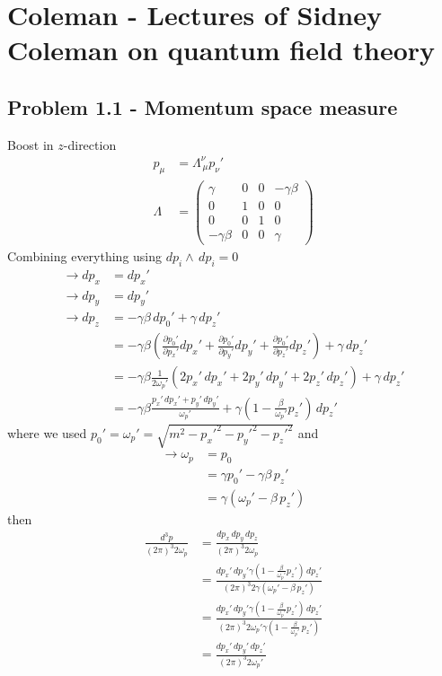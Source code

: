 \documentclass[10pt,a4paper]{book}
\theoremstyle{definition}
\begin{document}
\section{{\sc Coleman} - Lectures of Sidney Coleman on quantum field theory}
\subsection{Problem 1.1 - Momentum space measure}
Boost in $z$-direction
\begin{align}
p_\mu&=\Lambda^\nu_{\,\mu}p_\nu'\\ 
\Lambda&=\left(\begin{array}{cccc}
\gamma & 0 & 0 & -\gamma\beta\\
0 & 1 & 0 & 0\\
0 & 0 & 1 & 0\\
-\gamma\beta & 0 & 0 & \gamma
\end{array}\right)
\end{align}
Combining everything using $dp_i\wedge\,dp_i=0$
\begin{align}
\rightarrow dp_x&=dp_x'\\
\rightarrow dp_y&=dp_y'\\
\rightarrow dp_z
&=-\gamma\beta\,dp_0'+\gamma\,dp_z'\\
&=-\gamma\beta\left(\frac{\partial p_0'}{\partial p_x'}dp_x'+\frac{\partial p_0'}{\partial p_y'}dp_y'+\frac{\partial p_0'}{\partial p_z'}dp_z'\right)+\gamma\,dp_z'\\
&=-\gamma\beta\frac{1}{2\omega_p'}(2p_x'\,dp_x'+2p_y'\,dp_y'+2p_z'\,dp_z')+\gamma\,dp_z'\\
&=-\gamma\beta\frac{p_x'\,dp_x'+p_y'\,dp_y'}{\omega_p'}+\gamma\left(1-\frac{\beta}{\omega_p'}p_z'\right)\,dp_z'
\end{align}
where we used $p_0'=\omega_p'=\sqrt{m^2-{p_x'}^2-{p_y'}^2-{p_z'}^2}$ and 
\begin{align}
\rightarrow \omega_p&=p_0\\
&=\gamma p_0'-\gamma\beta\,p_z'\\
&=\gamma(\omega_p'-\beta\,p_z')
\end{align}
then
\begin{align}
\frac{d^3p}{(2\pi)^3 2\omega_p}
&=\frac{dp_x\,dp_y\,dp_z}{(2\pi)^3 2\omega_p}\\
&=\frac{dp_x'\,dp_y'\gamma\left(1-\frac{\beta}{\omega_p'}p_z'\right)\,dp_z'}{(2\pi)^3 2\gamma(\omega_p'-\beta\,p_z')}\\
&=\frac{dp_x'\,dp_y'\gamma\left(1-\frac{\beta}{\omega_p'}p_z'\right)\,dp_z'}{(2\pi)^3 2\omega_p'\gamma\left(1-\frac{\beta}{\omega_p'}\,p_z'\right)}\\
&=\frac{dp_x'\,dp_y'\,dp_z'}{(2\pi)^3 2\omega_p'}
\end{align}
\end{document}
